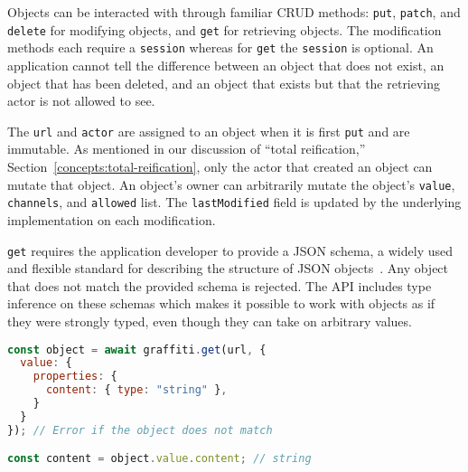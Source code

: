 Objects can be interacted with through familiar CRUD methods:
\texttt{put}, \texttt{patch}, and \texttt{delete} for modifying objects,
and \texttt{get} for retrieving objects.
The modification methods each require a \texttt{session} whereas
for \texttt{get} the \texttt{session} is optional.
An application cannot tell the difference between an object that does not exist,
an object that has been deleted, and an object that exists but that the retrieving actor
is not allowed to see.

The \texttt{url} and \texttt{actor} are assigned to an object when it is first \texttt{put}
and are immutable.
As mentioned in our discussion of ``total reification,'' Section~\ref{concepts:total-reification},
only the actor that created an object can mutate that object.
An object's owner can arbitrarily mutate the object's
\texttt{value}, \texttt{channels}, and \texttt{allowed} list.
The \texttt{lastModified} field is updated by the underlying implementation on each modification.

\texttt{get} requires the application developer to provide
a JSON schema, a widely used and flexible standard for describing
the structure of JSON objects~\cite{jsonschema}.
Any object that does not match the provided schema is rejected.
The API includes type inference on these schemas which makes it possible to work
with objects as if they were strongly typed, even though they can take on arbitrary values.

\begin{lstlisting}[language=javascript]
const object = await graffiti.get(url, {
  value: {
    properties: {
      content: { type: "string" },
    }
  }
}); // Error if the object does not match

const content = object.value.content; // string
\end{lstlisting}






